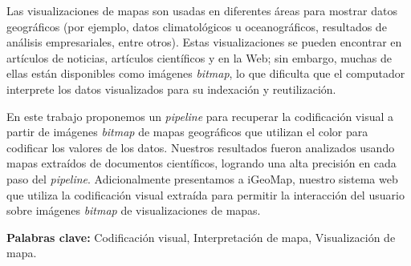 \begin{resumen}
Las visualizaciones de mapas son usadas en diferentes \'{a}reas para mostrar datos geogr\'{a}ficos (por ejemplo, datos climatológicos u oceanogr\'{a}ficos, resultados de análisis empresariales, entre otros). 
Estas visualizaciones se pueden encontrar en art\'{i}culos de noticias, art\'{i}culos cient\'{i}ficos y en la Web; sin embargo, muchas de ellas est\'{a}n disponibles como im\'{a}genes \textit{bitmap}, lo que dificulta que el computador interprete los datos visualizados para su indexaci\'{o}n y reutilizaci\'{o}n.

En este trabajo proponemos un \textit{pipeline} para recuperar la codificación visual a partir de im\'{a}genes \textit{bitmap} de mapas geogr\'{a}ficos que utilizan el color para codificar los valores de los datos. 
Nuestros resultados fueron analizados usando mapas extra\'{i}dos de documentos cient\'{i}ficos, logrando una alta precisi\'{o}n en cada paso del \textit{pipeline}. 
Adicionalmente presentamos a iGeoMap, nuestro sistema web que utiliza la codificaci\'{o}n visual extra\'{i}da para permitir la interacción del usuario sobre im\'{a}genes \textit{bitmap} de visualizaciones de mapas.

\begin{flushleft}
\textbf{Palabras clave:} Codificaci\'{o}n visual, Interpretaci\'{o}n de mapa, Visualizaci\'{o}n de mapa.
\end{flushleft}

\end{resumen}
